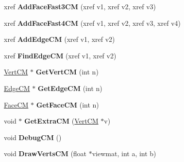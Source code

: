 \begin{DoxyCompactItemize}
\item 
\hypertarget{class_mesh_a12c00b955bcb77b551c8331cd5037d2b}{xref {\bfseries Add\+Face\+Fast3\+C\+M} (xref v1, xref v2, xref v3)}\label{class_mesh_a12c00b955bcb77b551c8331cd5037d2b}

\item 
\hypertarget{class_mesh_a38b3312cdbb3c87cd94ac28710165152}{xref {\bfseries Add\+Face\+Fast4\+C\+M} (xref v1, xref v2, xref v3, xref v4)}\label{class_mesh_a38b3312cdbb3c87cd94ac28710165152}

\item 
\hypertarget{class_mesh_abb33f96c9ef0d2178911de165ed91895}{xref {\bfseries Add\+Edge\+C\+M} (xref v1, xref v2)}\label{class_mesh_abb33f96c9ef0d2178911de165ed91895}

\item 
\hypertarget{class_mesh_a7ddd9284715de51825423536dbcc4b3e}{xref {\bfseries Find\+Edge\+C\+M} (xref v1, xref v2)}\label{class_mesh_a7ddd9284715de51825423536dbcc4b3e}

\item 
\hypertarget{class_mesh_a48d6322f079ace738d2bbf4114335552}{\hyperlink{struct_vert_c_m}{Vert\+C\+M} $\ast$ {\bfseries Get\+Vert\+C\+M} (int n)}\label{class_mesh_a48d6322f079ace738d2bbf4114335552}

\item 
\hypertarget{class_mesh_a3c5d2c1fc77e192ac93046bf0f775a5f}{\hyperlink{struct_edge_c_m}{Edge\+C\+M} $\ast$ {\bfseries Get\+Edge\+C\+M} (int n)}\label{class_mesh_a3c5d2c1fc77e192ac93046bf0f775a5f}

\item 
\hypertarget{class_mesh_a6a77f79a953f66a7d10fd54fbab42341}{\hyperlink{struct_face_c_m}{Face\+C\+M} $\ast$ {\bfseries Get\+Face\+C\+M} (int n)}\label{class_mesh_a6a77f79a953f66a7d10fd54fbab42341}

\item 
\hypertarget{class_mesh_ac93baf526d10506d5cf4107cd0b9d2e8}{void $\ast$ {\bfseries Get\+Extra\+C\+M} (\hyperlink{struct_vert_c_m}{Vert\+C\+M} $\ast$v)}\label{class_mesh_ac93baf526d10506d5cf4107cd0b9d2e8}

\item 
\hypertarget{class_mesh_afca64a54f19c910a152fa76950a4e2ff}{void {\bfseries Debug\+C\+M} ()}\label{class_mesh_afca64a54f19c910a152fa76950a4e2ff}

\item 
\hypertarget{class_mesh_a594b64938f3265e2f438b3bcf3bd85b8}{void {\bfseries Draw\+Verts\+C\+M} (float $\ast$viewmat, int a, int b)}\label{class_mesh_a594b64938f3265e2f438b3bcf3bd85b8}


\end{DoxyCompactItemize}
